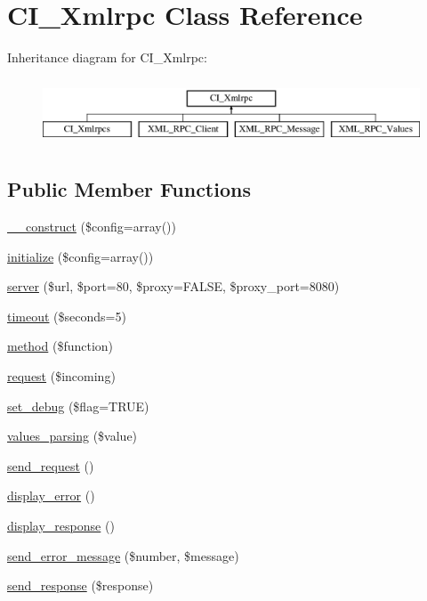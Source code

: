 \hypertarget{class_c_i___xmlrpc}{}\section{C\+I\+\_\+\+Xmlrpc Class Reference}
\label{class_c_i___xmlrpc}
Inheritance diagram for C\+I\+\_\+\+Xmlrpc\+:\begin{figure}[H]
\begin{center}
\leavevmode
\includegraphics[height=2.000000cm]{class_c_i___xmlrpc}
\end{center}
\end{figure}
\subsection*{Public Member Functions}
\begin{DoxyCompactItemize}
\item 
\mbox{\hyperlink{class_c_i___xmlrpc_af7f9493844d2d66e924e3c1df51ce616}{\+\_\+\+\_\+construct}} (\$config=array())
\item 
\mbox{\hyperlink{class_c_i___xmlrpc_a481385e36d920f5a5005ace05c6cd016}{initialize}} (\$config=array())
\item 
\mbox{\hyperlink{class_c_i___xmlrpc_a9969815a7195f6915eb73afcab3f9e9e}{server}} (\$url, \$port=80, \$proxy=F\+A\+L\+SE, \$proxy\+\_\+port=8080)
\item 
\mbox{\hyperlink{class_c_i___xmlrpc_ada3149e6290a7991c7dfc88c6c90f2db}{timeout}} (\$seconds=5)
\item 
\mbox{\hyperlink{class_c_i___xmlrpc_a3d7e090549ec52eba8cf65598eefa72c}{method}} (\$function)
\item 
\mbox{\hyperlink{class_c_i___xmlrpc_a10d4ec842c61f2301ecccc900500e4c8}{request}} (\$incoming)
\item 
\mbox{\hyperlink{class_c_i___xmlrpc_a277e289843ab2ff13a12441e1dd5cd37}{set\+\_\+debug}} (\$flag=T\+R\+UE)
\item 
\mbox{\hyperlink{class_c_i___xmlrpc_ae22fc267af5ff6330cb47172c78cc2c8}{values\+\_\+parsing}} (\$value)
\item 
\mbox{\hyperlink{class_c_i___xmlrpc_ad6f2431aec35ca073f3bdac3f0e8c66a}{send\+\_\+request}} ()
\item 
\mbox{\hyperlink{class_c_i___xmlrpc_adf0d809d39e17bc0e08387436db31386}{display\+\_\+error}} ()
\item 
\mbox{\hyperlink{class_c_i___xmlrpc_a3a8aedc2a1e6a67ad248dc6078ce8614}{display\+\_\+response}} ()
\item 
\mbox{\hyperlink{class_c_i___xmlrpc_a024ae8a44e09995c6d0b6cb50d8abd9a}{send\+\_\+error\+\_\+message}} (\$number, \$message)
\item 
\mbox{\hyperlink{class_c_i___xmlrpc_ac567feb54a4bda4cad24ff63d09267a1}{send\+\_\+response}} (\$response)
\end{DoxyCompactItemize}
